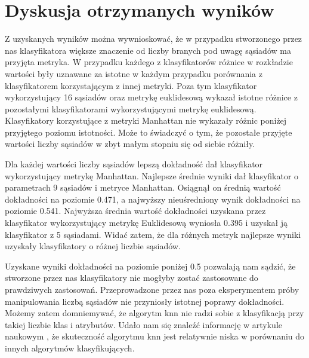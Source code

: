 \documentclass[runningheads]{llncs}
\begin{document}
\section{Dyskusja otrzymanych wyników}
Z uzyskanych wyników można wywnioskować, że w przypadku stworzonego przez nas klasyfikatora większe znaczenie od liczby branych pod uwagę sąsiadów ma przyjęta metryka. W przypadku każdego z klasyfikatorów różnice w rozkładzie wartości były uznawane za istotne w każdym przypadku porównania z klasyfikatorem korzystającym z innej metryki. Poza tym klasyfikator wykorzystujący 16 sąsiadów oraz metrykę euklidesową wykazał istotne różnice z pozostałymi klasyfikatorami wykorzystującymi metrykę euklidesową. Klasyfikatory korzystujące z metryki Manhattan nie wykazały różnic poniżej przyjętego poziomu istotności. Może to świadczyć o tym, że pozostałe przyjęte wartości liczby sąsiadów w zbyt małym stopniu się od siebie różniły. 

Dla każdej wartości liczby sąsiadów lepszą dokładność dał klasyfikator wykorzystujący metrykę Manhattan. Najlepsze średnie wyniki dał klasyfikator o parametrach 9 sąsiadów i metryce Manhattan. Osiągnął on średnią wartość dokładności na poziomie 0.471, a najwyższy nieuśredniony wynik dokładności na poziomie 0.541. Najwyższa średnia wartość dokładności uzyskana przez klasyfikator wykorzystujący metrykę Euklidesową wyniosła 0.395 i uzyskał ją klasyfikator z 5 sąsiadami. Widać zatem, że dla różnych metryk najlepsze wyniki uzyskały klasyfikatory o różnej liczbie sąsiadów. 

Uzyskane wyniki dokładności na poziomie poniżej 0.5 pozwalają nam sądzić, że stworzone przez nas klasyfikatory nie mogłyby zostać zastosowane do prawdziwych zastosowań. Przeprowadzone przez nas poza eksperymentem próby manipulowania liczbą sąsiadów nie przyniosły istotnej poprawy dokładności. Możemy zatem domniemywać, że algorytm knn nie radzi sobie z klasyfikacją przy takiej liczbie klas i atrybutów. Udało nam się znaleźć informację w artykule naukowym \cite{knnimprove}, że skuteczność algorytmu knn jest relatywnie niska w porównaniu do innych algorytmów klasyfikujących.

\newpage
%
%
%


%  
%

   

\end{document}
